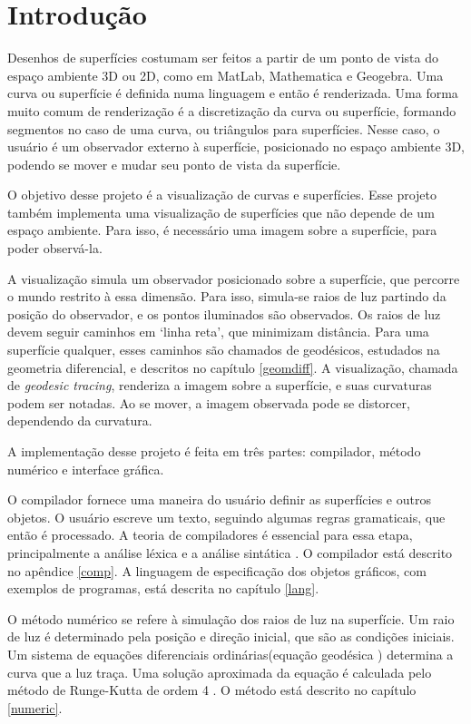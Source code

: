 \chapter{Introdução}
Desenhos de superfícies costumam ser feitos a partir de um ponto de vista do
espaço ambiente 3D ou 2D, como em MatLab, Mathematica e Geogebra.
Uma curva ou superfície é definida numa linguagem e então é renderizada.
Uma forma muito comum de renderização é a discretização da curva ou superfície,
formando segmentos no caso de uma curva, ou triângulos para superfícies.
Nesse caso, o usuário é um observador externo à superfície, posicionado no espaço ambiente
3D, podendo se mover e mudar seu ponto de vista da superfície.

O objetivo desse projeto é a visualização de curvas e superfícies.
Esse projeto também implementa uma visualização de superfícies que não depende de um espaço ambiente.
Para isso, é necessário uma imagem sobre a superfície, para poder observá-la.

A visualização simula um observador posicionado sobre a superfície, que percorre o mundo
restrito à essa dimensão.
Para isso, simula-se raios de luz partindo da posição do observador, e os pontos iluminados são observados.
Os raios de luz devem seguir caminhos em `linha reta', que minimizam distância.
Para uma superfície qualquer, esses caminhos são chamados de geodésicos,
estudados na geometria diferencial, e descritos no capítulo \ref{geomdiff}.
A visualização, chamada de \textit{geodesic tracing}, renderiza a imagem sobre a superfície,
e suas curvaturas podem ser notadas. Ao se mover, a imagem observada pode se distorcer,
dependendo da curvatura.

A implementação desse projeto é feita em três partes:
compilador, método numérico e interface gráfica.

O compilador fornece uma maneira do usuário definir as superfícies e outros objetos.
O usuário escreve um texto, seguindo algumas regras gramaticais, que então é processado.
A teoria de compiladores é essencial para essa etapa,
principalmente a análise léxica e a análise sintática \cite{Dragon:1}.
O compilador está descrito no apêndice \ref{comp}.
A linguagem de especificação dos objetos gráficos, com exemplos de programas, está descrita no capítulo \ref{lang}.

O método numérico se refere à simulação dos raios de luz na superfície.
Um raio de luz é determinado pela posição e direção inicial, que são as condições iniciais.
Um sistema de equações diferenciais ordinárias(equação geodésica \cite{GeomDiff:1})
determina a curva que a luz traça.
Uma solução aproximada da equação é calculada pelo método de Runge-Kutta de ordem 4 \cite{Anal:1}.
O método está descrito no capítulo \ref{numeric}.

